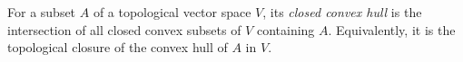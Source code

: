 
For a subset $A$ of a topological vector space $V$, its \emph{closed convex hull} is the intersection of all closed convex subsets of $V$ containing $A$. Equivalently, it is the topological closure of the convex hull of $A$ in $V$.
